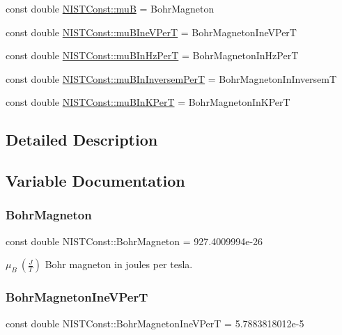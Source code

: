\begin{DoxyCompactItemize}
const double \hyperlink{group___bohr_magneton_gab42ee32e5e0323fc6268a5e14ac40b39}{N\+I\+S\+T\+Const\+::muB} = Bohr\+Magneton
\item 
const double \hyperlink{group___bohr_magneton_gad2bd4164d07de53146b14398c6d4790d}{N\+I\+S\+T\+Const\+::mu\+B\+Ine\+V\+PerT} = Bohr\+Magneton\+Ine\+V\+PerT
\item 
const double \hyperlink{group___bohr_magneton_gac590bf03985de37cfaeea7982dac2aa8}{N\+I\+S\+T\+Const\+::mu\+B\+In\+Hz\+PerT} = Bohr\+Magneton\+In\+Hz\+PerT
\item 
const double \hyperlink{group___bohr_magneton_ga4d426841ef01963272df91bd0534a966}{N\+I\+S\+T\+Const\+::mu\+B\+In\+Inversem\+PerT} = Bohr\+Magneton\+In\+InversemT
\item 
const double \hyperlink{group___bohr_magneton_ga51473ab154d1c4e8e9afca84952db156}{N\+I\+S\+T\+Const\+::mu\+B\+In\+K\+PerT} = Bohr\+Magneton\+In\+K\+PerT
\end{DoxyCompactItemize}


\subsection{Detailed Description}


\subsection{Variable Documentation}
\mbox{\label{group___bohr_magneton_gaace59be8951a23257cedcbef8f320c66}} 
\subsubsection{\texorpdfstring{Bohr\+Magneton}{BohrMagneton}}
{\footnotesize\ttfamily const double N\+I\+S\+T\+Const\+::\+Bohr\+Magneton = 927.\+4009994e-\/26}

$\mu_B \ (\frac{J}{T})$ Bohr magneton in joules per tesla. \mbox{\label{group___bohr_magneton_ga8b97d10b13a2c5de4f0d268370bc3c50}} 
\subsubsection{\texorpdfstring{Bohr\+Magneton\+Ine\+V\+PerT}{BohrMagnetonIneVPerT}}
{\footnotesize\ttfamily const double N\+I\+S\+T\+Const\+::\+Bohr\+Magneton\+Ine\+V\+PerT = 5.\+7883818012e-\/5}

